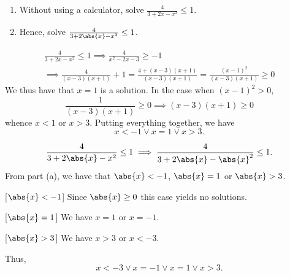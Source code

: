 \begin{problem}
    \begin{enumerate}
        \item Without using a calculator, solve $\frac4{3+2x-x^2} \leq 1$.
        \item Hence, solve $\frac4{3+2\abs{x}-x^2} \leq 1$.
    \end{enumerate}
\end{problem}
\clearpage
\begin{solution}
    \begin{ppart}
        \begin{gather*}
            \frac4{3+2x-x^2} \leq 1 \implies \frac4{x^2-2x-3} \geq -1\\
            \implies \frac4{(x-3)(x+1)} + 1 = \frac{4 + (x-3)(x+1)}{(x-3)(x+1)} = \frac{(x-1)^2}{(x-3)(x+1)} \geq 0
        \end{gather*}
        We thus have that $x = 1$ is a solution. In the case when $(x-1)^2 > 0$, \[\frac1{(x-3)(x+1)} \geq 0 \implies (x-3)(x+1) \geq 0\] whence $x < 1$ or $x > 3$. Putting everything together, we have \[x < -1 \lor x = 1 \lor x > 3.\]
    \end{ppart}
    \begin{ppart}
        \[\frac4{3+2\abs{x}-x^2} \leq 1 \implies \frac4{3+2\abs{x}-\abs{x}^2} \leq 1.\] From part (a), we have that $\abs{x} < -1$, $\abs{x} = 1$ or $\abs{x} > 3$.

        [$\abs{x} < -1$] Since $\abs{x} \geq 0$ this case yields no solutions.
        
        [$\abs{x} = 1$] We have $x = 1$ or $x = -1$.

        [$\abs{x} > 3$] We have $x > 3$ or $x < -3$.

        Thus, \[x < -3 \lor x = -1 \lor x = 1 \lor x > 3.\]
    \end{ppart}
\end{solution}

